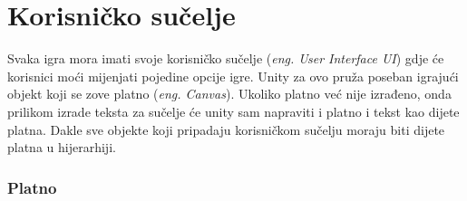 \section{Korisničko sučelje}
Svaka igra mora imati svoje korisničko sučelje (\emph{eng. User Interface UI}) gdje će korisnici moći mijenjati pojedine opcije igre. Unity za ovo pruža poseban igrajući objekt koji se zove platno (\emph{eng. Canvas}). Ukoliko platno već nije izrađeno, onda prilikom izrade teksta za sučelje će unity sam napraviti i platno i tekst kao dijete platna. Dakle sve objekte koji pripadaju korisničkom sučelju moraju biti dijete platna u hijerarhiji.
\subsubsection{Platno}
